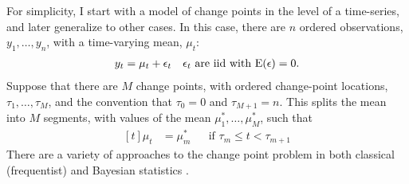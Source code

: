\documentclass[12pt]{article}
\begin{document}
For simplicity, I start with a model of change points in the level of a time-series, and later generalize to other cases.
In this case, there are $n$ ordered observations, $y_{1}, \dots, y_{n}$, with a time-varying mean, $\mu_{t}$:
\begin{equation}
  \label{dlm:eq:17}
  \begin{aligned}[t]
    y_{t} & = \mu_{t} + \epsilon_{t} && \text{$\epsilon_{t}$ are iid with $\operatorname{E}(\epsilon) = 0$.} \\
  \end{aligned}
\end{equation}
Suppose that there are $M$ change points, with ordered change-point locations, $\tau_{1}, \dots, \tau_{M}$, and the convention that $\tau_{0} = 0$ and $\tau_{M + 1} = n$.
This splits the mean into $M$ segments, with values of the mean $\mu^{*}_{1}, \dots, \mu^{*}_{M}$,  such that
\begin{equation}
  \label{dlm:eq:1}
  \begin{aligned}[t]
    \mu_{t} &= \mu^{*}_{m} && \text{if $\tau_{m} \leq t < \tau_{m + 1}$}
  \end{aligned}
\end{equation}
There are a variety of approaches to the change point problem in both classical (frequentist) \parencites{Page1954a}{Hinkley1970a}{BaiPerron2003a}{OlshenVenkatramanLucitoEtAl2004}{BaiPerron1998}{KillickFearnheadEckley2012} and Bayesian statistics \parencites{Yao1984}{BarryHartigan1993}{Chib1998}{Fearnhead2006a}{FearnheadLiu2007a}.
\end{document}
